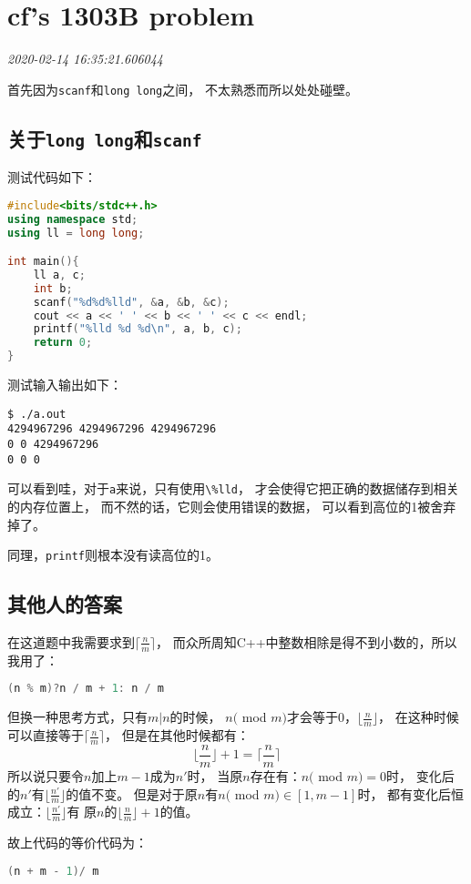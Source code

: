 \documentclass{peterlitsdoc}
\newcommand{\timetx}[1]
    {\par\noindent\emph{\pltgray\small #1}\vspace{2em}}
\newcommand{\vb}{\verb}
\begin{document}
\section{cf's 1303B problem}\timetx{2020-02-14 16:35:21.606044}

首先因为\vb|scanf|和\vb|long long|之间，
不太熟悉而所以处处碰壁。

\subsection{关于\vb|long long|和\vb|scanf|}
测试代码如下：
\begin{lstlisting}[language=C++]
#include<bits/stdc++.h>
using namespace std;
using ll = long long;

int main(){
    ll a, c;
    int b;
    scanf("%d%d%lld", &a, &b, &c);
    cout << a << ' ' << b << ' ' << c << endl;
    printf("%lld %d %d\n", a, b, c);
    return 0;
}
\end{lstlisting}

测试输入输出如下：
\begin{lstlisting}
$ ./a.out
4294967296 4294967296 4294967296
0 0 4294967296
0 0 0
\end{lstlisting}

可以看到哇，对于\vb|a|来说，只有使用\vb|\%lld|，
才会使得它把正确的数据储存到相关的内存位置上，
而不然的话，它则会使用错误的数据，
可以看到高位的1被舍弃掉了。

同理，\vb|printf|则根本没有读高位的1。

\subsection{其他人的答案}
在这道题中我需要求到$\lceil\frac{n}{m}\rceil$，
而众所周知C++中整数相除是得不到小数的，所以我用了：
\begin{lstlisting}[language=C++]
(n % m)?n / m + 1: n / m
\end{lstlisting}

但换一种思考方式，只有$m|n$的时候，
$n($ mod $m)$才会等于$0$，$\lfloor\frac{n}{m}\rfloor$，
在这种时候可以直接等于$\lceil\frac{n}{m}\rceil$，
但是在其他时候都有：
$$\lfloor\frac{n}{m}\rfloor + 1 = \lceil\frac{n}{m}\rceil$$
所以说只要令$n$加上$m-1$成为$n'$时，
当原$n$存在有：$n($ mod $m) = 0$时，
变化后的$n'$有$\lfloor\frac{n'}{m}\rfloor$的值不变。
但是对于原$n$有$n($ mod $m)\in [1, m-1]$时，
都有变化后恒成立：$\lfloor\frac{n'}{m}\rfloor$有
原$n$的$\lfloor\frac{n}{m}\rfloor + 1$的值。

故上代码的等价代码为：
\begin{lstlisting}[language=C++]
(n + m - 1)/ m
\end{lstlisting}
\end{document}
